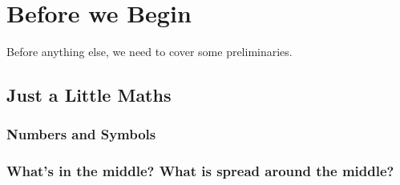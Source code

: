 \documentclass[landscape,	DIV=calc,%
							paper=letter,%
							fontsize=10pt,%
							twocolumn]{scrartcl}	 					%
\begin{document}
%
%
%
%
%
%
%
\section{Before we Begin}
Before anything else, we need to cover some preliminaries.
\subsection{Just a Little Maths}
\subsubsection{Numbers and Symbols}
\subsubsection{What's in the middle? What is spread around the middle?}
\end{document}
